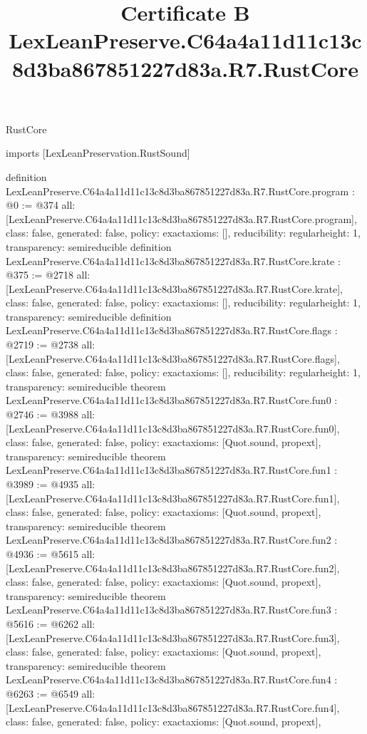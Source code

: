 \begin{lexlean}{RustCore}
\title{Certificate B LexLeanPreserve.C64a4a11d11c13c8d3ba867851227d83a.R7.RustCore}
\begin{coremodule}
imports [LexLeanPreservation.RustSound]

definition LexLeanPreserve.C64a4a11d11c13c8d3ba867851227d83a.R7.RustCore.program : @0 := @374 {
  all: [LexLeanPreserve.C64a4a11d11c13c8d3ba867851227d83a.R7.RustCore.program],
  class: false,
  generated: false,
  policy: exact{axioms: []},
  reducibility: regular{height: 1},
  transparency: semireducible
}
definition LexLeanPreserve.C64a4a11d11c13c8d3ba867851227d83a.R7.RustCore.krate : @375 := @2718 {
  all: [LexLeanPreserve.C64a4a11d11c13c8d3ba867851227d83a.R7.RustCore.krate],
  class: false,
  generated: false,
  policy: exact{axioms: []},
  reducibility: regular{height: 1},
  transparency: semireducible
}
definition LexLeanPreserve.C64a4a11d11c13c8d3ba867851227d83a.R7.RustCore.flags : @2719 := @2738 {
  all: [LexLeanPreserve.C64a4a11d11c13c8d3ba867851227d83a.R7.RustCore.flags],
  class: false,
  generated: false,
  policy: exact{axioms: []},
  reducibility: regular{height: 1},
  transparency: semireducible
}
theorem LexLeanPreserve.C64a4a11d11c13c8d3ba867851227d83a.R7.RustCore.fun0 : @2746 := @3988 {
  all: [LexLeanPreserve.C64a4a11d11c13c8d3ba867851227d83a.R7.RustCore.fun0],
  class: false,
  generated: false,
  policy: exact{axioms: [Quot.sound, propext]},
  transparency: semireducible
}
theorem LexLeanPreserve.C64a4a11d11c13c8d3ba867851227d83a.R7.RustCore.fun1 : @3989 := @4935 {
  all: [LexLeanPreserve.C64a4a11d11c13c8d3ba867851227d83a.R7.RustCore.fun1],
  class: false,
  generated: false,
  policy: exact{axioms: [Quot.sound, propext]},
  transparency: semireducible
}
theorem LexLeanPreserve.C64a4a11d11c13c8d3ba867851227d83a.R7.RustCore.fun2 : @4936 := @5615 {
  all: [LexLeanPreserve.C64a4a11d11c13c8d3ba867851227d83a.R7.RustCore.fun2],
  class: false,
  generated: false,
  policy: exact{axioms: [Quot.sound, propext]},
  transparency: semireducible
}
theorem LexLeanPreserve.C64a4a11d11c13c8d3ba867851227d83a.R7.RustCore.fun3 : @5616 := @6262 {
  all: [LexLeanPreserve.C64a4a11d11c13c8d3ba867851227d83a.R7.RustCore.fun3],
  class: false,
  generated: false,
  policy: exact{axioms: [Quot.sound, propext]},
  transparency: semireducible
}
theorem LexLeanPreserve.C64a4a11d11c13c8d3ba867851227d83a.R7.RustCore.fun4 : @6263 := @6549 {
  all: [LexLeanPreserve.C64a4a11d11c13c8d3ba867851227d83a.R7.RustCore.fun4],
  class: false,
  generated: false,
  policy: exact{axioms: [Quot.sound, propext]},
}
\end{coremodule}
\end{lexlean}
